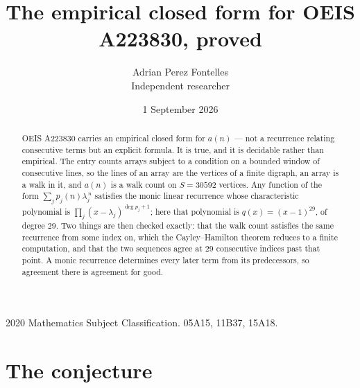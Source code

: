 \documentclass[11pt,a4paper]{article}
\title{The empirical closed form for OEIS A223830, proved}
\author{Adrian Perez Fontelles\\ \small Independent researcher}
\date{1 September 2026}
\theoremstyle{plain}
\theoremstyle{definition}
\begin{document}
\maketitle

\begin{abstract}
OEIS A223830 carries an empirical closed form for $a(n)$ --- not a recurrence relating
consecutive terms but an explicit formula. It is true, and it is decidable rather than
empirical. The entry counts arrays subject to a condition on a bounded window of consecutive lines, so the lines of an array are the
vertices of a finite digraph, an array is a walk in it, and $a(n)$ is a walk count on
$S=30592$ vertices. Any function of the form $\sum_j p_j(n)\lambda_j^{\,n}$ satisfies the
monic linear recurrence whose characteristic polynomial is
$\prod_j(x-\lambda_j)^{\deg p_j+1}$; here that polynomial is $q(x)=(x-1)^{29}$, of degree
$29$. Two things are then checked exactly: that the walk count satisfies the same
recurrence from some index on, which the Cayley--Hamilton theorem reduces to a finite
computation, and that the two sequences agree at $29$ consecutive indices past that
point. A monic recurrence determines every later term from its predecessors, so agreement
there is agreement for good.
\end{abstract}

\noindent\small 2020 Mathematics Subject Classification. 05A15, 11B37, 15A18.\normalsize

\section{The conjecture}
\end{document}
